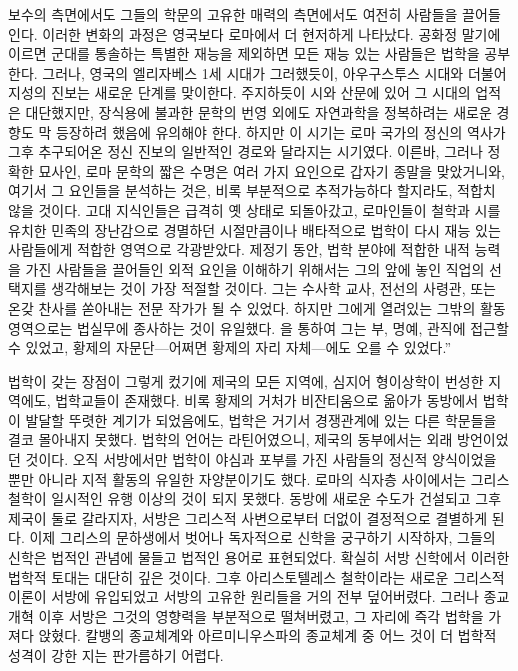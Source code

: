 보수의 측면에서도 그들의 학문의 고유한 매력의 측면에서도
여전히 사람들을 끌어들인다.
이러한 변화의 과정은 영국보다 로마에서 더 현저하게 나타났다.
공화정 말기에 이르면
군대를 통솔하는 특별한 재능을 제외하면
모든 재능 있는 사람들은
법학을 공부한다.
그러나,
영국의 엘리자베스 1세 시대가 그러했듯이,
아우구스투스 시대와 더불어
지성의 진보는 새로운 단계를 맞이한다.
주지하듯이 시와 산문에 있어 그 시대의 업적은 대단했지만,
장식용에 불과한 문학의 번영 외에도
자연과학을 정복하려는 새로운 경향도 막 등장하려 했음에
유의해야 한다.
하지만 이 시기는 로마 국가의 정신의 역사가
그후 추구되어온 정신 진보의 일반적인 경로와 달라지는 시기였다.
이른바, 그러나 정확한 묘사인, 로마 문학의 짧은 수명은
여러 가지 요인으로 갑자기 종말을 맞았거니와,
여기서 그 요인들을 분석하는 것은,
비록 부분적으로 추적가능하다 할지라도,
적합치 않을 것이다.
고대 지식인들은 급격히
옛 상태로 되돌아갔고,
로마인들이 철학과 시를 유치한 민족의 장난감으로 경멸하던 시절만큼이나
배타적으로 법학이 다시
재능 있는 사람들에게 적합한 영역으로 각광받았다.
제정기 동안,
법학 분야에 적합한
내적 능력을 가진 사람들을 끌어들인
외적 요인을 이해하기 위해서는
그의 앞에 놓인 직업의 선택지를 생각해보는 것이
가장 적절할 것이다.
그는 수사학 교사,
전선의 사령관,
또는 온갖 찬사를 쏟아내는 전문 작가가 될 수 있었다.
하지만 그에게 열려있는 그밖의 활동영역으로는
법실무에 종사하는 것이 유일했다.
을 통하여 그는
부, 명예, 관직에 접근할 수 있었고,
황제의 자문단---어쩌면 황제의 자리 자체---에도
오를 수 있었다.''

법학이 갖는 장점이 그렇게 컸기에
제국의 모든 지역에, 심지어 형이상학이 번성한 지역에도,
법학교들이 존재했다.
비록 황제의 거처가 비잔티움으로 옮아가
동방에서 법학이 발달할 뚜렷한 계기가 되었음에도,
법학은 거기서 경쟁관계에 있는 다른 학문들을 결코 몰아내지 못했다.
법학의 언어는 라틴어였으니,
제국의 동부에서는 외래 방언이었던 것이다.
오직 서방에서만
법학이 야심과 포부를 가진 사람들의 정신적 양식이었을 뿐만 아니라
지적 활동의 유일한 자양분이기도 했다.
로마의 식자층 사이에서는 그리스 철학이
일시적인 유행 이상의 것이 되지 못했다.
동방에 새로운 수도가 건설되고 그후 제국이 둘로 갈라지자,
서방은
그리스적 사변으로부터
더없이 결정적으로
결별하게 된다.
이제 그리스의 문하생에서 벗어나
독자적으로 신학을 궁구하기 시작하자,
그들의 신학은 법적인 관념에 물들고 법적인 용어로 표현되었다.
확실히 서방 신학에서 이러한 법학적 토대는 대단히 깊은 것이다.
그후 아리스토텔레스 철학이라는 새로운 그리스적 이론이
서방에 유입되었고 서방의 고유한 원리들을 거의 전부 덮어버렸다.
그러나
종교개혁 이후 서방은
그것의 영향력을
부분적으로 떨쳐버렸고,
그 자리에 즉각 법학을 가져다 앉혔다.
칼뱅의 종교체계와
아르미니우스파의 종교체계 중
어느 것이 더 법학적 성격이 강한 지는 판가름하기 어렵다.

